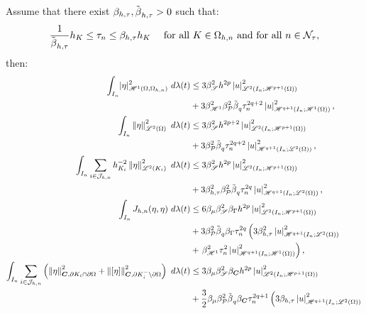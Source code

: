\begin{lemma}
    Assume that there exist $\beta_{h, \tau}, \tilde{\beta_{}}_{h, \tau} > 0$ such that:
    \begin{align}
        \frac{1}{\tilde{\beta_{}}_{h, \tau}} h_K &\leq \tau_n \leq \beta_{h, \tau} h_K &\text{ for all } K \in \Omega_{h, n} \text{ and for all } n \in \mathcal{N}_{\tau}, \label{equation:ass_ht}
    \end{align}
    then:
    \begin{align}
        \int_{I_n} \lvert \eta \rvert_{\SpaceHk{1}(\Omega, \Omega_{h, n})}^2 ~ d \lambda(t) &\leq 3 \BoundInterp^2 h^{2p} \Seminorm{u}_{\SpaceLp{2}(I_n; \SpaceHk{p + 1}(\Omega))}^2 \\
        &+ 3 \BoundH^2 \BoundPoly^2 \BoundQVariant \tau_n^{2q + 2} \Seminorm{u}_{\SpaceHk{q + 1}(I_n; \SpaceHk{1}(\Omega))}^2, \notag \\
        \TimeIntN{\Norm{\eta}_{\SpaceLp{2}(\Omega)}^2} & \leq 3 \BoundInterp^2 h^{2p + 2} \Seminorm{u}_{\SpaceLp{2}(I_n; \SpaceHk{p + 1}(\Omega))}^2 \\
        &+ 3 \BoundPoly^2 \BoundQVariant \tau_n^{2q + 2} \Seminorm{u}_{\SpaceHk{q + 1}(I_n; \SpaceLp{2}(\Omega))}^2, \notag \\
        \TimeIntN{ \sum_{i \in \SpaceTimeIndices} h_{K_i}^{-2} \Norm{\eta}_{\SpaceLp{2}(K_i)}^2 } &\leq 3 \BoundInterp^2 h^{2p} \Seminorm{u}_{\SpaceLp{2}(I_n; \SpaceHk{p + 1}(\Omega))}^2 \\
        &+  3 \BoundHT^2 \BoundPoly^2 \BoundQVariant \tau_n^{2q} \Seminorm{u}_{\SpaceHk{q + 1}(I_n; \SpaceLp{2}(\Omega))}^2, \notag \\
        \TimeIntN{J_{h, n}(\eta, \eta)} &\leq 6 \BoundTrace \BoundInterp^2 \BoundDeg h^{2p} \Seminorm{u}_{\SpaceLp{2}(I_n; \SpaceHk{p + 1}(\Omega))}^2 \\
        &+ 3 \BoundPoly^2 \BoundQVariant \BoundDeg \tau_n^{2q} \left( 3 \BoundHT^2 \Seminorm{u}_{\SpaceHk{q + 1}(I_n; \SpaceLp{2}(\Omega))}^2 \right. \notag \\
        &+ \left.\BoundH^2 \tau_n^2 \Seminorm{u}_{\SpaceHk{q + 1}(I_n; \SpaceHk{1}(\Omega))}^2 \right), \notag \\
        \TimeIntN{ \sum_{i \in \SpaceTimeIndices} \left( \Norm{\eta}_{\Convection, \partial K_i \cap \partial \Omega}^2 + \Norm{\left[ \eta \right]}_{\Convection, \partial K_i^- \setminus \partial \Omega}^2 \right) } &\leq 3 \BoundTrace \BoundInterp^2 \BoundC{\Convection} h^{2p} \Seminorm{u}_{\SpaceLp{2}(I_n; \SpaceHk{p + 1}(\Omega))}^2 \\
        &+ \frac{3}{2} \BoundTrace \BoundPoly^2 \BoundQVariant \BoundC{\Convection} \tau_n^{2q + 1} \left( 3 \BoundHT \Seminorm{u}_{\SpaceHk{q + 1}(I_n; \SpaceLp{2}(\Omega))}^2 \right. \notag \\

\end{align}
\end{lemma}
